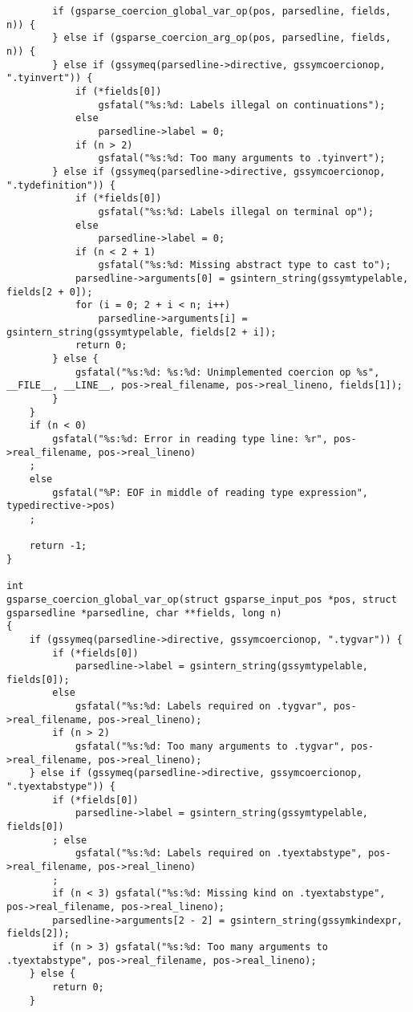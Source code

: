 \documentclass{report}
\begin{document}
\begin{verbatim}
        if (gsparse_coercion_global_var_op(pos, parsedline, fields, n)) {
        } else if (gsparse_coercion_arg_op(pos, parsedline, fields, n)) {
        } else if (gssymeq(parsedline->directive, gssymcoercionop, ".tyinvert")) {
            if (*fields[0])
                gsfatal("%s:%d: Labels illegal on continuations");
            else
                parsedline->label = 0;
            if (n > 2)
                gsfatal("%s:%d: Too many arguments to .tyinvert");
        } else if (gssymeq(parsedline->directive, gssymcoercionop, ".tydefinition")) {
            if (*fields[0])
                gsfatal("%s:%d: Labels illegal on terminal op");
            else
                parsedline->label = 0;
            if (n < 2 + 1)
                gsfatal("%s:%d: Missing abstract type to cast to");
            parsedline->arguments[0] = gsintern_string(gssymtypelable, fields[2 + 0]);
            for (i = 0; 2 + i < n; i++)
                parsedline->arguments[i] = gsintern_string(gssymtypelable, fields[2 + i]);
            return 0;
        } else {
            gsfatal("%s:%d: %s:%d: Unimplemented coercion op %s", __FILE__, __LINE__, pos->real_filename, pos->real_lineno, fields[1]);
        }
    }
    if (n < 0)
        gsfatal("%s:%d: Error in reading type line: %r", pos->real_filename, pos->real_lineno)
    ;
    else
        gsfatal("%P: EOF in middle of reading type expression", typedirective->pos)
    ;

    return -1;
}

int
gsparse_coercion_global_var_op(struct gsparse_input_pos *pos, struct gsparsedline *parsedline, char **fields, long n)
{
    if (gssymeq(parsedline->directive, gssymcoercionop, ".tygvar")) {
        if (*fields[0])
            parsedline->label = gsintern_string(gssymtypelable, fields[0]);
        else
            gsfatal("%s:%d: Labels required on .tygvar", pos->real_filename, pos->real_lineno);
        if (n > 2)
            gsfatal("%s:%d: Too many arguments to .tygvar", pos->real_filename, pos->real_lineno);
    } else if (gssymeq(parsedline->directive, gssymcoercionop, ".tyextabstype")) {
        if (*fields[0])
            parsedline->label = gsintern_string(gssymtypelable, fields[0])
        ; else
            gsfatal("%s:%d: Labels required on .tyextabstype", pos->real_filename, pos->real_lineno)
        ;
        if (n < 3) gsfatal("%s:%d: Missing kind on .tyextabstype", pos->real_filename, pos->real_lineno);
        parsedline->arguments[2 - 2] = gsintern_string(gssymkindexpr, fields[2]);
        if (n > 3) gsfatal("%s:%d: Too many arguments to .tyextabstype", pos->real_filename, pos->real_lineno);
    } else {
        return 0;
    }


\end{verbatim}
\end{document}
